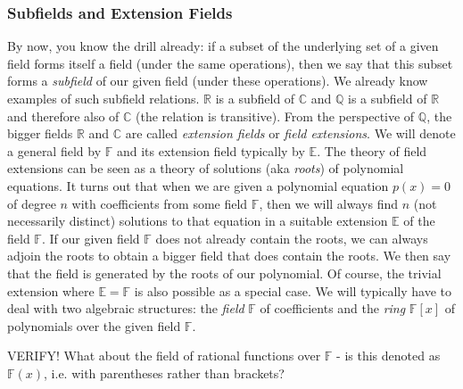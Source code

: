 



\subsubsection{Subfields and Extension Fields}
By now, you know the drill already: if a subset of the underlying set of a given field forms itself a field (under the same operations), then we say that this subset forms a \emph{subfield} of our given field (under these operations). We already know examples of such subfield relations. $\mathbb{R}$ is a subfield of $\mathbb{C}$ and $\mathbb{Q}$ is a subfield of $\mathbb{R}$ and therefore also of $\mathbb{C}$ (the relation is transitive). From the perspective of $\mathbb{Q}$, the bigger fields $\mathbb{R}$ and $\mathbb{C}$ are called \emph{extension fields} or \emph{field extensions}. We will denote a general field by $\mathbb{F}$ and its extension field typically by $\mathbb{E}$. The theory of field extensions can be seen as a theory of solutions (aka \emph{roots}) of polynomial equations. It turns out that when we are given a polynomial equation $p(x) = 0$ of degree $n$ with coefficients from some field $\mathbb{F}$, then we will always find $n$ (not necessarily distinct) solutions to that equation in a suitable extension $\mathbb{E}$ of the field $\mathbb{F}$. If our given field $\mathbb{F}$ does not already contain the roots, we can always adjoin the roots to obtain a bigger field that does contain the roots. We then say that the field is generated by the roots of our polynomial. Of course, the trivial extension where $\mathbb{E} = \mathbb{F}$ is also possible as a special case. We will typically have to deal with two algebraic structures: the \emph{field} $\mathbb{F}$ of coefficients and the \emph{ring} $\mathbb{F}[x]$ of polynomials over the given field $\mathbb{F}$.

VERIFY! What about the field of rational functions over $\mathbb{F}$ - is this denoted as $\mathbb{F}(x)$, i.e. with parentheses rather than brackets?

